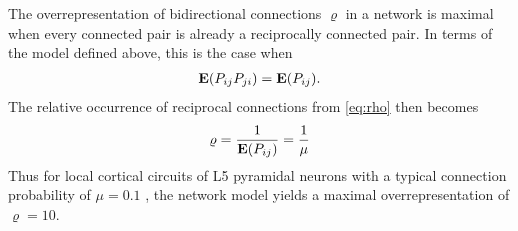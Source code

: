 
The overrepresentation of bidirectional connections $\varrho$ in a network is maximal when every connected pair is already a reciprocally connected pair. In terms of the model defined above, this is the case when
\begin{align}
\operatorname{\mathbf{E}}(P_{ij} P_{ji}) = \operatorname{\mathbf{E}}(P_{ij}).
\end{align}
%
The relative occurrence of reciprocal connections from \eqref{eq:rho} then becomes
\begin{align}
\varrho = \frac{1}{\operatorname{\mathbf{E}}(P_{ij})} = \frac{1}{\mu} \label{eq:rho_max}
\end{align}
Thus for local cortical circuits of L5 pyramidal neurons with a typical connection probability of $\mu = 0.1$ \cite{Thomson2002,Song2005}, the network model yields a maximal overrepresentation of $\varrho = 10$.
